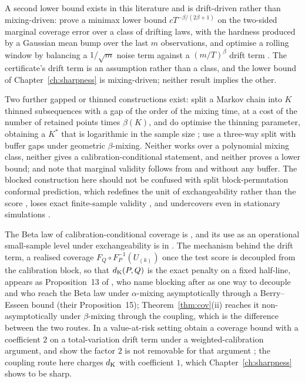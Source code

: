 \documentclass[../../../main.tex]{subfiles}
\begin{document}
A second lower bound exists in this literature and is drift-driven rather than mixing-driven: \citet[Thm.~4]{halkiewicz2026} prove a minimax lower bound $cT^{-\beta/(2\beta+1)}$ on the two-sided marginal coverage error over a class of drifting laws, with the hardness produced by a Gaussian mean bump over the last $m$ observations, and optimise a rolling window by balancing a $1/\sqrt m$ noise term against a $(m/T)^\beta$ drift term \citep[Sect.~3.4, eq.~(6)]{halkiewicz2026}. The certificate's drift term is an assumption rather than a class, and the lower bound of Chapter~\ref{ch:sharpness} is mixing-driven; neither result implies the other.

Two further gapped or thinned constructions exist: \citep[Prop.~5.1]{zheng2024} split a Markov chain into $K$ thinned subsequences with a gap of the order of the mixing time, at a cost of the number of retained points times $\beta(K)$, and do optimise the thinning parameter, obtaining a $K^*$ that is logarithmic in the sample size \citep[Thm.~5.1]{zheng2024}; \cite{allohibi2026} use a three-way split with buffer gaps under geometric $\beta$-mixing. Neither works over a polynomial mixing class, neither gives a calibration-conditional statement, and neither proves a lower bound; and \cite{allohibi2026} note that marginal validity follows from \cite{oliveira2024} and \cite{barber2026} without any buffer. The blocked construction here should not be confused with split block-permutation conformal prediction, which redefines the unit of exchangeability rather than the score \citep[§3, p.~7]{stocker2025}, loses exact finite-sample validity \citep[§3.4, p.~13]{stocker2025}, and undercovers even in stationary simulations \citep[p.~15]{stocker2025}.

The Beta law of calibration-conditional coverage is \cite{vovk2012}, and its use as an operational small-sample level under exchangeability is in \cite{zwart2025}. The mechanism behind the drift term, a realised coverage $F_Q\circ F_P^{-1}(U_{(k)})$ once the test score is decoupled from the calibration block, so that $d_{\mathrm{K}}(P,Q)$ is the exact penalty on a fixed half-line, appears as Proposition~13 of \cite{ramos2026}, who name blocking after \cite{yu1994} as one way to decouple and who reach the Beta law under $\alpha$-mixing asymptotically through a Berry--Esseen bound (their Proposition~15); Theorem~\ref{thm:cov}(ii) reaches it non-asymptotically under $\beta$-mixing through the coupling, which is the difference between the two routes. In a value-at-risk setting \citet[Thm.~1, p.~3]{schmitt2026} obtain a coverage bound with a coefficient $2$ on a total-variation drift term under a weighted-calibration argument, and show the factor $2$ is not removable for that argument \citep[p.~3]{schmitt2026}; the coupling route here charges $d_{\mathrm{K}}$ with coefficient $1$, which Chapter~\ref{ch:sharpness} shows to be sharp.
\end{document}
